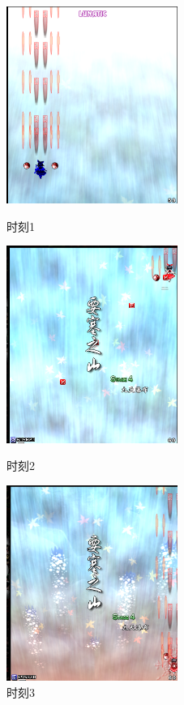 \documentclass[UTF8]{ctexart}
\begin{document}
\begin{figure}[H]
\begin{minipage}[t]{0.5\linewidth}
\centering
\includegraphics[width=2.2in]{images/touhou1.png}
\caption{时刻1}
\end{minipage}%
\begin{minipage}[t]{0.5\linewidth}
\centering
\includegraphics[width=2.2in]{images/touhou2.png}
\caption{时刻2}
\end{minipage}
\begin{minipage}[t]{0.5\linewidth}
\centering
\includegraphics[width=2.2in]{images/touhou3.png}
\caption{时刻3}
\end{minipage}
\begin{minipage}[t]{0.5\linewidth}

\end{minipage}
\end{figure}
\end{document}
